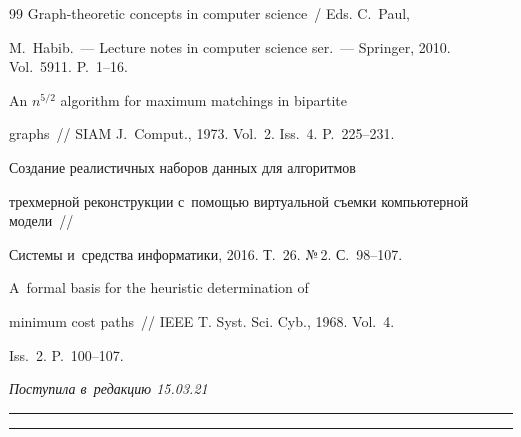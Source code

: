 {{\begin{thebibliography}{99}
  Graph-theoretic concepts in computer science~/ Eds. C.~Paul, 

M.~Habib.~--- Lecture notes in computer science ser.~--- Springer, 2010. Vol.~5911. P.~1--16.


   An $n^{5/2}$ algorithm for maximum matchings in bipartite 

graphs~/\!\!/ SIAM J.~Comput., 1973. Vol.~2. Iss.~4. P.~225--231.


   Создание реалистичных наборов данных для алгоритмов 

трехмерной реконструкции с~помощью виртуальной съемки компьютерной модели~/\!\!/ 

Системы и~средства информатики, 2016. Т.~26. №\,2. С.~98--107.


   A~formal basis for the heuristic determination of 

minimum cost paths~/\!\!/ IEEE T. Syst. Sci. Cyb., 1968. Vol.~4. 

Iss.~2. P.~100--107.

       \end{thebibliography}

} }







\vspace*{-3pt}



\hfill{\small\textit{Поступила в~редакцию 15.03.21}}









\vspace*{6pt}



\hrule



\vspace*{2pt}









\hrule



